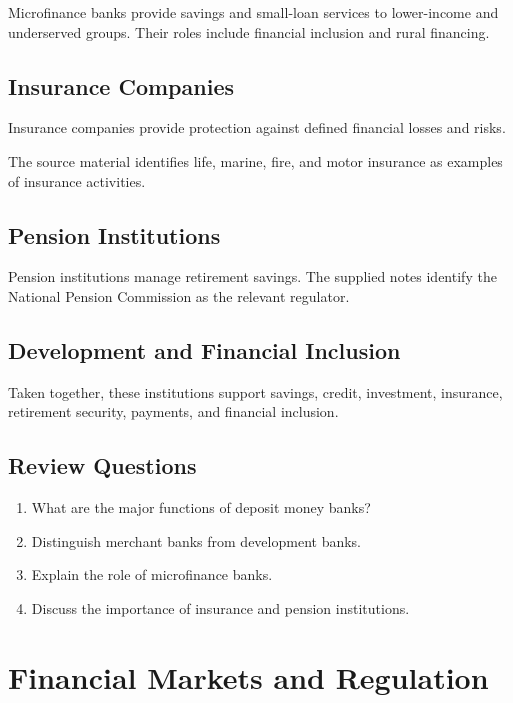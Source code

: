 \documentclass[
]{article}
\providecommand{\tightlist}{%
  \setlength{\itemsep}{0pt}\setlength{\parskip}{0pt}}
\begin{document}
Microfinance banks provide savings and small-loan services to lower-income and underserved groups. Their roles include financial inclusion and rural financing.

\subsection{Insurance Companies}\label{insurance-companies}

Insurance companies provide protection against defined financial losses and risks.

The source material identifies life, marine, fire, and motor insurance as examples of insurance activities.

\subsection{Pension Institutions}\label{pension-institutions}

Pension institutions manage retirement savings. The supplied notes identify the National Pension Commission as the relevant regulator.

\subsection{Development and Financial Inclusion}\label{development-and-financial-inclusion}

Taken together, these institutions support savings, credit, investment, insurance, retirement security, payments, and financial inclusion.

\subsection{Review Questions}\label{review-questions-2}

\begin{enumerate}
\def\labelenumi{\arabic{enumi}.}
\tightlist
\item
  What are the major functions of deposit money banks?
\item
  Distinguish merchant banks from development banks.
\item
  Explain the role of microfinance banks.
\item
  Discuss the importance of insurance and pension institutions.
\end{enumerate}

\section{Financial Markets and Regulation}\label{financial-markets-and-regulation}
\end{document}
